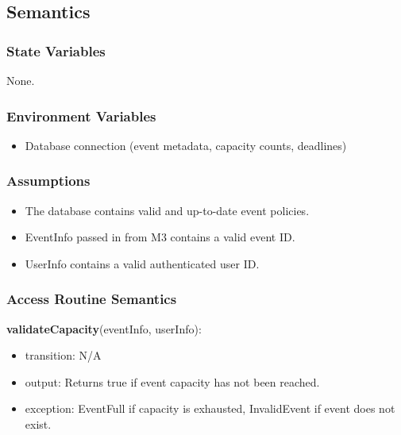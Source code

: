 \documentclass[12pt, titlepage]{article}
\begin{document}
\subsection{Semantics}

\subsubsection{State Variables}

None.

\subsubsection{Environment Variables}

\begin{itemize}
    \item Database connection (event metadata, capacity counts, deadlines)
\end{itemize}

\subsubsection{Assumptions}

\begin{itemize}
    \item The database contains valid and up-to-date event policies.
    \item EventInfo passed in from M3 contains a valid event ID.
    \item UserInfo contains a valid authenticated user ID.
\end{itemize}

\subsubsection{Access Routine Semantics}

\noindent \textbf{validateCapacity}(eventInfo, userInfo):

\begin{itemize}
    \item transition: N/A
    \item output: Returns true if event capacity has not been reached.
    \item exception: EventFull if capacity is exhausted, InvalidEvent if event does not exist.
\end{itemize}

\vspace{0.15cm}
\end{document}
